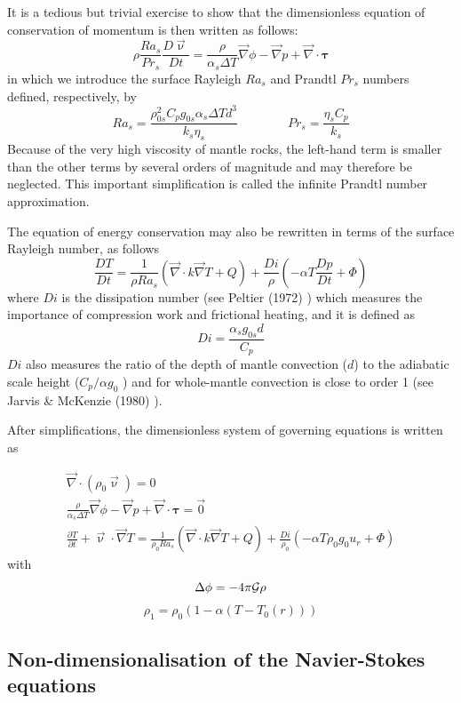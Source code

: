 It is a tedious but trivial exercise to show that the dimensionless equation of 
conservation of momentum is then written as follows:
\[
\rho \frac{Ra_s}{Pr_s} \frac{D\vec\upnu}{Dt} =
\frac{\rho}{\alpha_s \Delta T} \vec\nabla \phi - \vec\nabla p + \vec\nabla \cdot {\bm \tau}
\]
in which we introduce the surface Rayleigh $Ra_s$ and Prandtl $Pr_s$ numbers defined, 
respectively, by
\[
Ra_s=\frac{\rho_{0s}^2 C_p g_{0s} \alpha_s \Delta T d^3}{k_s \eta_s}
\qquad
\qquad
Pr_s= \frac{\eta_s C_p}{k_s}
\]
Because of the very high viscosity of mantle rocks, the left-hand term 
is smaller than the other terms by several orders of magnitude
and may therefore be neglected. This important simplification is called the 
infinite Prandtl number approximation. 

The equation of energy conservation may also be rewritten in terms of the surface Rayleigh number, as follows
\[
\frac{D T}{D t} = \frac{1}{\rho Ra_s} \left( \vec\nabla\cdot k\vec\nabla T + Q \right) 
+\frac{Di}{\rho} \left( -\alpha T \frac{Dp}{Dt} + \Phi  \right)
\]
where $Di$ is the dissipation number (see Peltier (1972) \cite{pelt72}) 
which measures the importance of compression work and frictional heating, and it is defined
as 
\[
Di=\frac{\alpha_s g_{0s} d}{C_p}
\]
$Di$ also measures the ratio of the depth of mantle convection ($d$) to 
the adiabatic scale height ($C_p/\alpha g_0$ ) and for whole-mantle convection is
close to order 1 (see Jarvis \& McKenzie (1980) \cite{jamc80}).

After simplifications, the dimensionless system of governing equations is written as

\begin{eqnarray}
\vec\nabla\cdot(\rho_0 \vec\upnu) =0 \\
\frac{\rho}{\alpha_s \Delta T} \vec\nabla \phi - \vec\nabla p + \vec\nabla \cdot {\bm \tau} = \vec{0} \\
\frac{\partial T}{\partial t} + \vec\upnu\cdot\vec\nabla T =  
\frac{1}{\rho_0 Ra_s} \left( \vec\nabla\cdot k\vec\nabla T + Q \right) +
\frac{Di}{\rho_0} (-\alpha T \rho_0 g_0 u_r + \Phi) 
\end{eqnarray}
with 
\[
\Delta \phi = -4\pi {\cal G} \rho
\]
\[
\rho_1=\rho_0(1-\alpha(T-T_0(r)))
\]

\subsection{Non-dimensionalisation of the Navier-Stokes equations}\label{ss:nondim}

